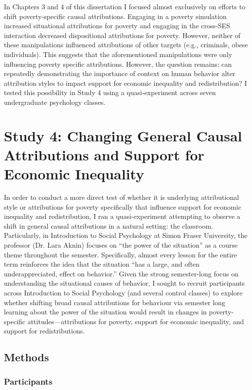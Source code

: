 \documentclass{sfuthesis}
\begin{document}
In Chapters 3 and 4 of this dissertation I focused almost exclusively on efforts to shift poverty-specific causal attributions. Engaging in a poverty simulation increased situational attributions for poverty and engaging in the cross-SES interaction decreased dispositional attributions for poverty. However, neither of these manipulations influenced attributions of other targets (e.g., criminals, obese individuals). This suggests that the aforementioned manipulations were only influencing poverty specific attributions. However, the question remains: can repeatedly demonstrating the importance of context on human behavior alter attribution styles to impact support for economic inequality and redistribution? I tested this possibility in Study 4 using a quasi-experiment across seven undergraduate psychology classes.

\section{Study 4: Changing General Causal Attributions and Support for Economic Inequality}

In order to conduct a more direct test of whether it is underlying attributional style or attributions for poverty specifically that influence support for economic inequality and redistribution, I ran a quasi-experiment attempting to observe a shift in general causal attributions in a natural setting: the classroom. Particularly, in Introduction to Social Psychology at Simon Fraser University, the professor (Dr. Lara Aknin) focuses on “the power of the situation” as a course theme throughout the semester. Specifically, almost every lesson for the entire term reinforces the idea that the situation “has a large, and often underappreciated, effect on behavior.” Given the strong semester-long focus on understanding the situational causes of behavior, I sought to recruit participants across Introduction to Social Psychology (and several control classes) to explore whether shifting broad causal attributions for behaviour via semester long learning about the power of the situation would result in changes in poverty-specific attitudes—attributions for poverty, support for economic inequality, and support for redistributions.

\subsection{Methods}
\subsubsection{Participants}
\end{document}
